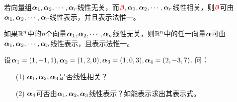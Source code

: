 \begin{frame}
  \begin{dingli}
    若向量组$\alphabd_1,\alphabd_2,\cd,\alphabd_r$线性无关，而$\red{\betabd},\alphabd_1,\alphabd_2,\cd,\alphabd_r$线性相关，则$\red{\betabd}$可由$\alphabd_1,\alphabd_2,\cd,\alphabd_r$线性表示，并且表示法惟一。
  \end{dingli} \vspace{0.1in}

  \begin{tuilun}
    如果$\R^n$中的$n$个向量$\alphabd_1,\alphabd_2,\cd,\alphabd_n$线性无关，则$\R^n$中的任一向量$\alphabd$可由$\alphabd_1,\alphabd_2,\cd,\alphabd_n$线性表示，且表示法惟一。
  \end{tuilun}
\end{frame}

\begin{frame}
  \begin{li}
    设$\alphabd_1=(1,-1,1),\alphabd_2=(1,2,0),\alphabd_3=(1,0,3),\alphabd_4=(2,-3,7)$.  问：
    \begin{itemize}
    \item[(1)]$\alphabd_1,\alphabd_2,\alphabd_3$是否线性相关？
    \item[(2)]$\alphabd_4$可否由$\alphabd_1,\alphabd_2,\alphabd_3$线性表示？如能表示求出其表示式。
    \end{itemize}
  \end{li}

\end{frame}
